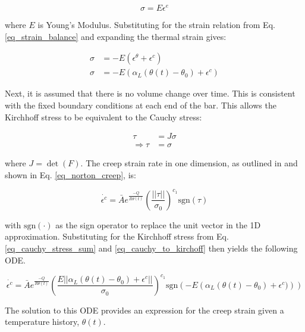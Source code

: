 \documentclass[conf]{new-aiaa}
\begin{document}
\begin{equation}
\sigma = E  \epsilon^e 
\end{equation}

\noindent
where $E$ is Young's Modulus.
Substituting for the strain relation from Eq. \ref{eq_strain_balance} 
and expanding the thermal strain gives:

\begin{align}
\sigma &= -E \left( \epsilon^\theta + \epsilon^c \right)  \\
\sigma &= -E \left( \alpha_L (\theta(t) - \theta_0) + \epsilon^c \right) 
\label{eq_cauchy_stress_sum}
\end{align}

\noindent
Next, it is assumed that there is no volume change over time.
This is consistent with the fixed boundary conditions at 
each end of the bar.
This allows the Kirchhoff stress to be equivalent to the Cauchy stress:

\begin{align}
\tau &= J \sigma \\
\Rightarrow
  \tau &= \sigma \label{eq_cauchy_to_kirchoff}
\end{align}

\noindent
where $J=\det(F)$.
The creep strain rate in one dimension, as outlined in 
\cite{ li_simulation_of_finite_strain_inelastic_phenomena_governed_by_creep_and_plasticity}
and shown in Eq. \ref{eq_norton_creep}, is:

\begin{equation}
\dot{\epsilon^c} = \bar{A} e^{\frac{-Q}{R \theta(t)}} \left( \frac{ ||\tau||}{\sigma_0} \right)^{c_1} \text{sgn}(\tau)
\end{equation}

\noindent
with $\text{sgn}(\cdot)$ as the sign operator to replace the unit vector in the 1D approximation.
Substituting for the Kirchhoff stress from Eq. \ref{eq_cauchy_stress_sum} and \ref{eq_cauchy_to_kirchoff}
then yields the following ODE.

\begin{equation} \label{eq_creep_ode}
\dot{\epsilon^c} = \bar{A} e^{\frac{-Q}{R \theta(t)}} 
    \left( \frac{E || \alpha_L (\theta(t) - \theta_0) + \epsilon^c||}{\sigma_0} \right)^{c_1} 
    \text{sgn}\left( -E \left( \alpha_L (\theta(t) - \theta_0) + \epsilon^c) \right) \right)
\end{equation}

\noindent
The solution to this ODE provides an expression for the creep strain
given a temperature history, $\theta(t)$.
\end{document}

